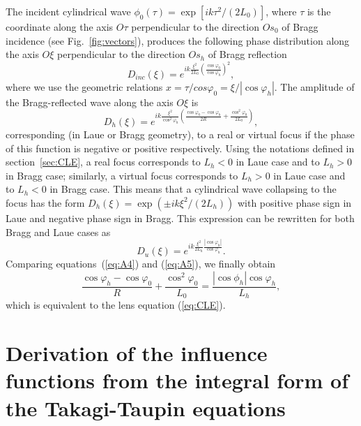 \documentclass[preprint]{iucr}              %
\newcommand{\inred}[1]{{\color{red}#1}}
\begin{document}
The incident cylindrical wave $\phi_0(\tau)=\exp[i k \tau^2 / (2L_0)]$, where $\tau$ is the coordinate along the axis $O\tau$ perpendicular to the direction $Os_0$ of Bragg incidence (see Fig.~\ref{fig:vectors}), produces the following phase distribution along the axis $O\xi$ perpendicular to the direction $Os_h$ of Bragg reflection 
\begin{equation}
    D_{inc}(\xi) = e^{i k \frac{\xi^2}{2L_0}\left(\frac{\cos\varphi_0}{\cos\varphi_h}\right)^2},
\end{equation}
where we use the geometric relations $x=\tau/cos\varphi_0=\xi/|\cos\varphi_h|$. The amplitude of the Bragg-reflected wave along the axis $O\xi$ is
\begin{equation}
\label{eq:A4}
    D_h(\xi) = e^{i k
    \frac{\xi^2}{\cos^2\varphi_h}\left(\frac{\cos\varphi_0-\cos\varphi_h}{2R} + \frac{\cos^2\varphi_0}{2L_0}\right)},
\end{equation}
corresponding (in Laue or Bragg geometry), to a real or virtual focus if the phase of this function is negative or positive respectively. Using the notations defined in section~\ref{sec:CLE}, a real focus corresponds to $L_h<0$ in Laue case and to $L_h>0$ in Bragg case; similarly, a \inred{virtual} focus corresponds to $L_h>0$ in Laue case and to $L_h<0$ in Bragg case. This means that \inred{a cylindrical wave collapsing to the focus has the form} $D_h(\xi) = \exp(\pm i k \xi^2 / (2L_h))$ \inred{with positive phase sign} in Laue \inred{and negative phase sign} in Bragg. This expression can be rewritten \inred{for both Bragg and Laue cases} as
\begin{equation}
\label{eq:A5}
D_u(\xi) = e^{i k \frac{\xi^2}{2 L_h}\frac{|\cos\varphi_h|}{\cos\varphi_h}}.   
\end{equation}
Comparing equations~(\ref{eq:A4}) and (\ref{eq:A5}), we finally obtain
\begin{equation}
    \frac{\cos\varphi_h-\cos\varphi_0}{R}+
    \frac{\cos^2\varphi_0}{L_0}=\frac{|\cos\phi_h|\cos\varphi_h}{L_h},
\end{equation}
which is equivalent to the lens equation (\ref{eq:CLE}).

\section{Derivation of the influence functions from the integral form of the Takagi-Taupin equations}
\label{appendix:TTEintegral}
\end{document}
